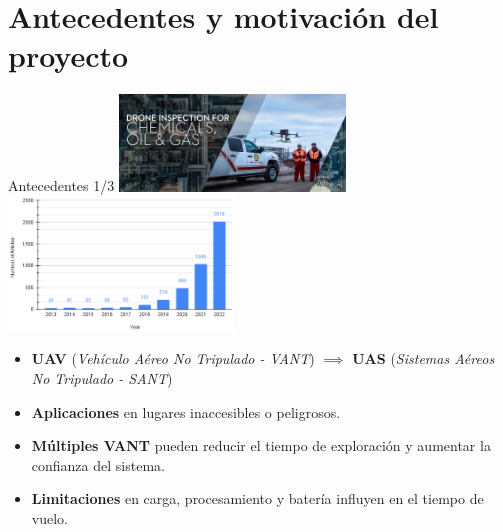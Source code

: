 \documentclass[
  24pt, %
  aspectratio=169, %
]{beamer}
\begin{document}
\section{Antecedentes y motivación del proyecto}
\begin{frame}{Antecedentes 1/3}
  \bigskip %
  \centering
  \includegraphics[width=0.45\textwidth,height=0.35\textheight]{DJI_B4}
  \hfil
  \includegraphics[width=0.45\textwidth,height=0.35\textheight]{drones-07-00236-g001.png}\footnotemark
  \vspace{2pt}\\
  
  \begin{itemize}
  \item \textbf{UAV} {\tiny(\textit{Vehículo Aéreo No Tripulado - VANT})}  $\implies$ \textbf{UAS} {\tiny(\textit{Sistemas Aéreos No Tripulado - SANT})}
  \item \textbf{Aplicaciones} en lugares inaccesibles o peligrosos.
  \item \textbf{Múltiples VANT} pueden reducir el tiempo de exploración y aumentar la confianza del sistema.
  \item \textbf{Limitaciones} en carga, procesamiento y batería influyen en el tiempo de vuelo.
  \end{itemize}
  
\end{frame}
\end{document}
